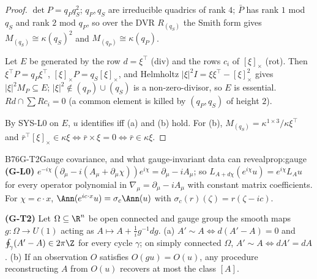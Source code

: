\begin{proof}
$\det P=q_Pq_S^2$; $q_P,q_S$ are irreducible quadrics of rank $4$; $\bar P$ has rank $1$ mod $q_S$ and rank $2$ mod $q_P$, so over the DVR $R_{(q_S)}$ the Smith form gives $M_{(q_S)}\cong\kappa(q_S)^2$ and $M_{(q_P)}\cong\kappa(q_P)$.

Let $E$ be generated by the row $d=\xi^{\top}$ (div) and the rows $c_i$ of $[\xi]_\times$ (rot). Then $\xi^{\top}P=q_P\xi^{\top}$, $[\xi]_\times P=q_S[\xi]_\times$, and Helmholtz $|\xi|^2I=\xi\xi^{\top}-[\xi]_\times^2$ gives $|\xi|^2M_P\subseteq E$; $|\xi|^2\notin(q_P)\cup(q_S)$ is a non-zero-divisor, so $E$ is essential. $Rd\cap\sum Rc_i=0$ (a common element is killed by $(q_P,q_S)$ of height $2$).

By SYS-L0 on $E$, $u$ identifies iff (a) and (b) hold. For (b), $M_{(q_S)}=\kappa^{1\times3}/\kappa\xi^{\top}$ and $\bar r^{\top}[\xi]_\times\in\kappa\xi\iff\bar r\times\xi=0\iff\bar r\in\kappa\xi$.

\end{proof}

\begin{dimcard}{B76}{G-T2}{Gauge covariance, and what gauge-invariant data can reveal}{\proved}{prop:gauge}
\textbf{(G-L0)} $e^{-i\chi}(\partial_\mu-i(A_\mu+\partial_\mu\chi))e^{i\chi}=\partial_\mu-iA_\mu$; so $L_{A+d\chi}(e^{i\chi}u)=e^{i\chi}L_Au$ for every operator polynomial in $\nabla_\mu=\partial_\mu-iA_\mu$ with constant matrix coefficients. For $\chi=c\cdot x$, $\Ann(e^{ic\cdot x}u)=\sigma_c\Ann(u)$ with $\sigma_c(r)(\zeta)=r(\zeta-ic)$.

\textbf{(G-T2)} Let $\Omega\subseteq\R^n$ be open connected and gauge group the smooth maps $g:\Omega\to U(1)$ acting as $A\mapsto A+\frac1ig^{-1}dg$. (a) $A'\sim A\iff d(A'-A)=0$ and $\oint_\gamma(A'-A)\in2\pi\Z$ for every cycle $\gamma$; on simply connected $\Omega$, $A'\sim A\iff dA'=dA$. (b) If an observation $O$ satisfies $O(gu)=O(u)$, any procedure reconstructing $A$ from $O(u)$ recovers at most the class $[A]$.
\end{dimcard}

